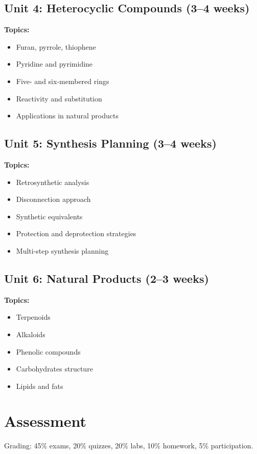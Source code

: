 \documentclass[12pt,oneside]{book}
\begin{document}
\subsection{Unit 4: Heterocyclic Compounds (3--4 weeks)}

\textbf{Topics:}
\begin{itemize}
    \item Furan, pyrrole, thiophene
    \item Pyridine and pyrimidine
    \item Five- and six-membered rings
    \item Reactivity and substitution
    \item Applications in natural products
\end{itemize}

\subsection{Unit 5: Synthesis Planning (3--4 weeks)}

\textbf{Topics:}
\begin{itemize}
    \item Retrosynthetic analysis
    \item Disconnection approach
    \item Synthetic equivalents
    \item Protection and deprotection strategies
    \item Multi-step synthesis planning
\end{itemize}

\subsection{Unit 6: Natural Products (2--3 weeks)}

\textbf{Topics:}
\begin{itemize}
    \item Terpenoids
    \item Alkaloids
    \item Phenolic compounds
    \item Carbohydrates structure
    \item Lipids and fats
\end{itemize}

\section{Assessment}

Grading: 45\% exams, 20\% quizzes, 20\% labs, 10\% homework, 5\% participation.
\end{document}
